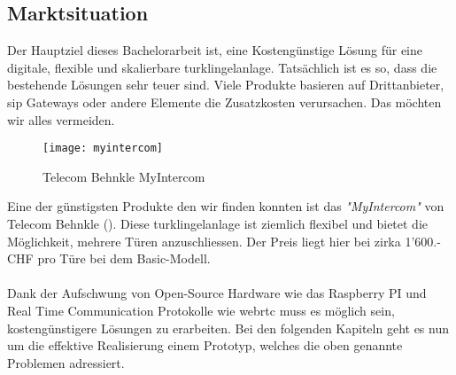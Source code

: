 \subsection{Marktsituation}
\label{sec:chapterexample}
Der Hauptziel dieses Bachelorarbeit ist, eine Kostengünstige Lösung für eine digitale, flexible und skalierbare \gls{turklingelanlage}. Tatsächlich ist es so, dass die bestehende Lösungen sehr teuer sind. Viele Produkte basieren auf Drittanbieter, \gls{sip} Gateways oder andere Elemente die Zusatzkosten verursachen. Das möchten wir alles vermeiden.

\begin{figure}[htb!]
	\begin{center}
		\texttt{[image: myintercom]}
		\caption[Telecom Behnkle MyIntercom]{Telecom Behnkle MyIntercom}
		\label{fig:myintercom}
	\end{center}
\end{figure}

Eine der günstigsten Produkte den wir finden konnten ist das \textit{"MyIntercom"} von Telecom Behnkle (). Diese \gls{turklingelanlage} ist ziemlich flexibel und bietet die Möglichkeit, mehrere Türen anzuschliessen. Der Preis liegt hier bei zirka 1'600.- CHF pro Türe bei dem Basic-Modell.
\\
\\
 Dank der Aufschwung von Open-Source Hardware wie das Raspberry PI und Real Time Communication Protokolle wie \gls{webrtc} muss es möglich sein, kostengünstigere Lösungen zu erarbeiten. Bei den folgenden Kapiteln geht es nun um die effektive Realisierung einem Prototyp, welches die oben genannte Problemen adressiert. 

\newpage